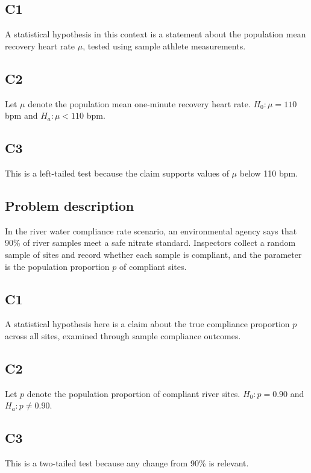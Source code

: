 \begin{ExamProblems}
		\subsection*{C1}
		A statistical hypothesis in this context is a statement about the population mean recovery heart rate \(\mu\), tested using sample athlete measurements.

		\subsection*{C2}
		Let \(\mu\) denote the population mean one-minute recovery heart rate. \(H_0\colon \mu = 110\) bpm and \(H_a\colon \mu < 110\) bpm.

		\subsection*{C3}
		This is a left-tailed test because the claim supports values of \(\mu\) below 110 bpm.

		\item
		\subsection*{Problem description}
		In the river water compliance rate scenario, an environmental agency says that 90\% of river samples meet a safe nitrate standard. Inspectors collect a random sample of sites and record whether each sample is compliant, and the parameter is the population proportion \(p\) of compliant sites.

		\subsection*{C1}
		A statistical hypothesis here is a claim about the true compliance proportion \(p\) across all sites, examined through sample compliance outcomes.

		\subsection*{C2}
		Let \(p\) denote the population proportion of compliant river sites. \(H_0\colon p = 0.90\) and \(H_a\colon p \neq 0.90\).

		\subsection*{C3}
		This is a two-tailed test because any change from 90\% is relevant.


\end{ExamProblems}
